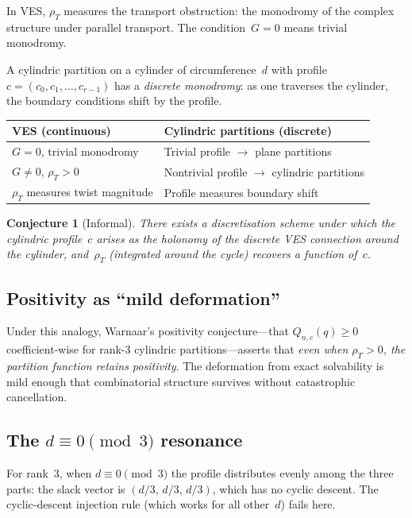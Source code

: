\documentclass[11pt]{article}
\newcommand{\rhoT}{\rho_T}
\theoremstyle{plain}
\newtheorem{conjecture}{Conjecture}
\theoremstyle{definition}
\theoremstyle{remark}
\begin{document}
In VES, $\rhoT$ measures the transport obstruction: the monodromy of
the complex structure under parallel transport. The condition~$G=0$
means trivial monodromy.

A cylindric partition on a cylinder of circumference~$d$ with profile
$c=(c_0,c_1,\ldots,c_{r-1})$ has a \emph{discrete monodromy}: as one
traverses the cylinder, the boundary conditions shift by the profile.

\medskip
\begin{center}
\begin{tabular}{@{}ll@{}}
\toprule
\textbf{VES (continuous)} & \textbf{Cylindric partitions (discrete)} \\
\midrule
$G=0$, trivial monodromy & Trivial profile $\to$ plane partitions \\
$G\ne 0$, $\rhoT>0$ & Nontrivial profile $\to$ cylindric partitions \\
$\rhoT$ measures twist magnitude & Profile measures boundary shift \\
\bottomrule
\end{tabular}
\end{center}
\medskip

\begin{conjecture}[Informal]
There exists a discretisation scheme under which the cylindric
profile~$c$ arises as the holonomy of the discrete VES connection
around the cylinder, and~$\rhoT$ (integrated around the cycle)
recovers a function of~$c$.
\end{conjecture}

\subsection{Positivity as ``mild deformation''}

Under this analogy, Warnaar's positivity conjecture---that
$Q_{n,c}(q)\ge 0$ coefficient-wise for rank-3 cylindric
partitions---asserts that \emph{even when $\rhoT>0$, the partition
function retains positivity}. The deformation from exact solvability
is mild enough that combinatorial structure survives without
catastrophic cancellation.

\subsection{The $d\equiv 0\pmod{3}$ resonance}

For rank~3, when $d\equiv 0\pmod{3}$ the profile distributes evenly
among the three parts: the slack vector is
$(d/3,\,d/3,\,d/3)$, which has no cyclic descent. The
cyclic-descent injection rule (which works for all other~$d$) fails
here.
\end{document}
